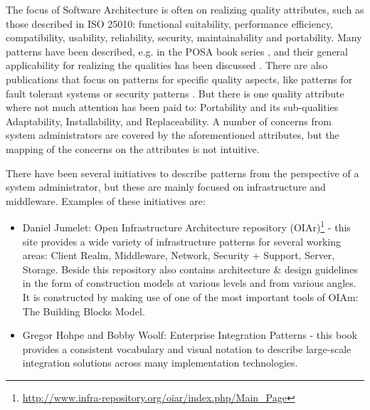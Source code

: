 The focus of Software Architecture is often on realizing quality attributes, such as those described in ISO 25010: functional suitability, performance efficiency, compatibility, usability, reliability, security, maintainability and portability. Many patterns have been described, e.g. in the POSA book series \cite{Buschmann1996}, and their general applicability for realizing the qualities has been discussed \cite{Harrison2011}. 
There are also publications that focus on patterns for specific quality aspects, like patterns for fault tolerant systems \cite{Hanmer2007} or security patterns \cite{Schumacher2005}.
 But there is one quality attribute where not much attention has been paid to: Portability and its sub-qualities Adaptability, Installability, and Replaceability. A number of concerns from system administrators are covered by the aforementioned attributes, but the mapping of the concerns on the attributes is not intuitive.

There have been several initiatives to describe patterns from the perspective of a system administrator, but these are mainly focused on infrastructure and middleware. Examples of these initiatives are: 
\begin{itemize}
	\item Daniel Jumelet: Open Infrastructure Architecture repository (OIAr)\footnote{\url{http://www.infra-repository.org/oiar/index.php/Main_Page}} - this site provides a wide variety of infrastructure patterns for several working areas: Client Realm, Middleware, Network, Security + Support, Server, Storage. Beside this repository also contains architecture \& design guidelines in the form of construction models at various levels and from various angles. It is constructed by making use of one of the most important tools of OIAm: The Building Blocks Model. 
	\item Gregor Hohpe and Bobby Woolf: Enterprise Integration Patterns\cite{Hohpe2003} - this book provides a consistent vocabulary and visual notation to describe large-scale integration solutions across many implementation technologies. 
\end{itemize}

